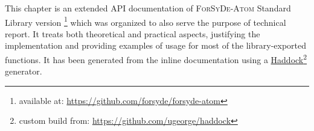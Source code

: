 This chapter is an extended API documentation of \textsc{ForSyDe-Atom} Standard Library version \AtomVersion\footnote{available at: \url{https://github.com/forsyde/forsyde-atom}} which was organized to also serve the purpose of technical report. It treats both theoretical and practical aspects, justifying the implementation and providing examples of usage for most of the library-exported functions. It has been generated from the inline documentation using a \href{https://www.haskell.org/haddock/}{\mbox{Haddock}}\footnote{custom build from: \url{https://github.com/ugeorge/haddock}} generator.
